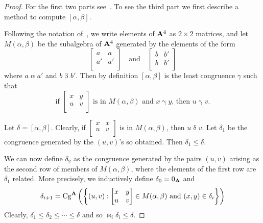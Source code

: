 \begin{proof}
For the first two parts see~\cite[Proposition~6.1]{Freese:2009}.
To see the third part we first describe a method to compute
$[\alpha,\beta]$.


Following the notation of~\cite{FreeseMcKenzie1987}, we write
elements of $\mathbf{A}^4$ as $2 \times 2$ matrices, and
let $M(\alpha,\beta)$ be the subalgebra of $\mathbf{A}^4$ generated by
the elements of the form
\[
\begin{bmatrix}
a & a\\
a' & a'\\
\end{bmatrix}
\quad \text{and} \quad
\begin{bmatrix}
b & b'\\
b & b'\\
\end{bmatrix}
\]
where $a \mathrel\alpha a'$ and $b \mathrel\beta b'$. Then
by definition
$[\alpha,\beta]$ is the least congruence $\gamma$ such that
\begin{equation}\label{commprop}\text{if }
\begin{bmatrix}
x & y\\
u & v\\
\end{bmatrix}
\text{ is in $M(\alpha,\beta)$ and $x \mathrel\gamma y$,
then $u \mathrel\gamma v$.}
\end{equation}

Let $\delta = [\alpha,\beta]$. Clearly, if
$\begin{bmatrix}
x & x\\
u & v\\
\end{bmatrix}$ is in  $M(\alpha,\beta)$, then $u \mathrel\delta v$.
Let $\delta_1$ be the congruence generated by the $(u,v)$'s so
obtained. Then $\delta_1 \le \delta$.





We can now define $\delta_2$ as the congruence generated by the pairs
$(u,v)$ arising as the second row of members of $M(\alpha,\beta)$,
where the elements of the first row are $\delta_1$ related.
More precisely, we inductively define $\delta_0 = 0_{\mathbf{A}}$ and
\begin{equation}\label{delta}
\delta_{i+1} = \operatorname{Cg}^{\mathbf{A}}\bigg(\bigg\{(u,v) :
\begin{bmatrix}
x & y \\
u & v\\
\end{bmatrix}
\in M(\alpha,\beta) \text{ and } (x,y) \in \delta_i\bigg\}\bigg)
\end{equation}
Clearly, $\delta_1 \le \delta_2 \le \cdots \le
\delta$ and so $\Join_i \delta_i \le \delta$.


\end{proof}
